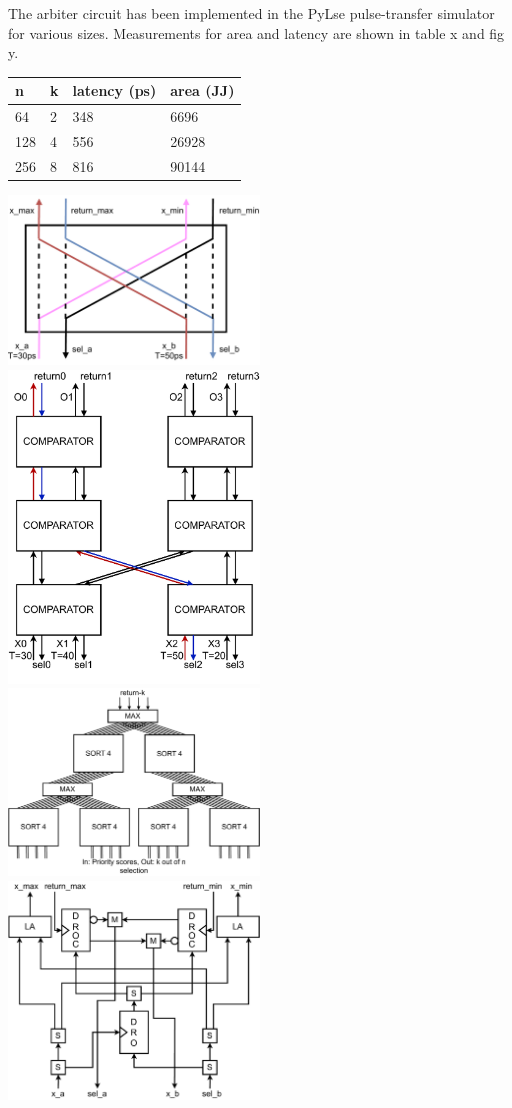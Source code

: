 \documentclass{article}
\begin{document}
The arbiter circuit has been implemented in the PyLse
pulse-transfer simulator for various sizes. Measurements for
area and latency are shown in table x and fig y.

\begin{table}[]
\begin{tabular}{|l|l|l|l|}
\hline
n   & k & latency (ps) & area (JJ) \\ \hline
64  & 2 & 348          & 6696      \\ \hline
128 & 4 & 556          & 26928     \\ \hline
256 & 8 & 816          & 90144     \\ \hline
\end{tabular}
\end{table}

\includegraphics*[width=0.5\textwidth]{diagrams/comparator.drawio.pdf}
\includegraphics*[width=0.5\textwidth]{diagrams/sort4.drawio.pdf}
\includegraphics*[width=0.5\textwidth]{diagrams/arbiterk4n16.drawio.pdf}
\includegraphics*[width=0.5\textwidth]{diagrams/circuit_comparator.drawio.pdf}
\end{document}
